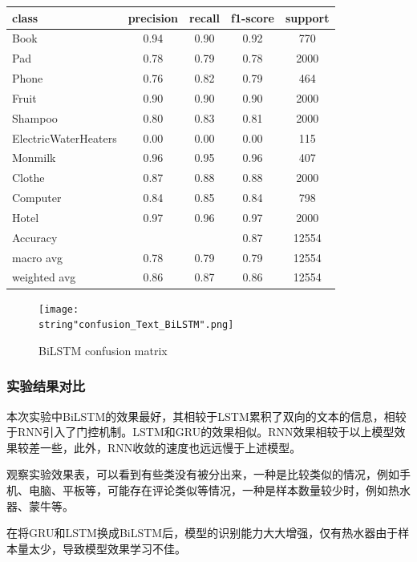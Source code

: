 \documentclass[UTF8]{ctexart}
\begin{document}
\begin{tabular}{|l|c|c|c|c|} %
    \hline 
    class & precision & recall & f1-score & support\\
    \hline 
    Book & 0.94&0.90&0.92&770\\
    Pad &0.78&0.79&0.78&2000\\
    Phone &0.76&0.82&0.79&464\\
    Fruit &0.90&0.90&0.90&2000\\
    Shampoo &0.80&0.83&0.81&2000\\
    ElectricWaterHeaters &0.00&0.00&0.00&115\\
    Monmilk &0.96&0.95&0.96&407\\
    Clothe &0.87&0.88&0.88&2000\\
    Computer &0.84&0.85&0.84&798\\
    Hotel &0.97&0.96&0.97&2000\\
    Accuracy& &&0.87&12554\\
    macro avg & 0.78&0.79&0.79&12554\\
    weighted avg& 0.86&0.87&0.86&12554\\
    \hline 
\end{tabular}

\begin{figure}[H]
    \begin{center}
        \texttt{[image: \\string"confusion\_Text\_BiLSTM".png]}
    \caption{BiLSTM confusion matrix}
    \label{fig:11}
    \end{center}
    \end{figure}
\par

\subsubsection{实验结果对比}
本次实验中BiLSTM的效果最好，其相较于LSTM累积了双向的文本的信息，相较于RNN引入了门控机制。LSTM和GRU的效果相似。RNN效果相较于以上模型效果较差一些，此外，RNN收敛的速度也远远慢于上述模型。\par

观察实验效果表，可以看到有些类没有被分出来，一种是比较类似的情况，例如手机、电脑、平板等，可能存在评论类似等情况，一种是样本数量较少时，例如热水器、蒙牛等。\par

在将GRU和LSTM换成BiLSTM后，模型的识别能力大大增强，仅有热水器由于样本量太少，导致模型效果学习不佳。\par
\end{document}
